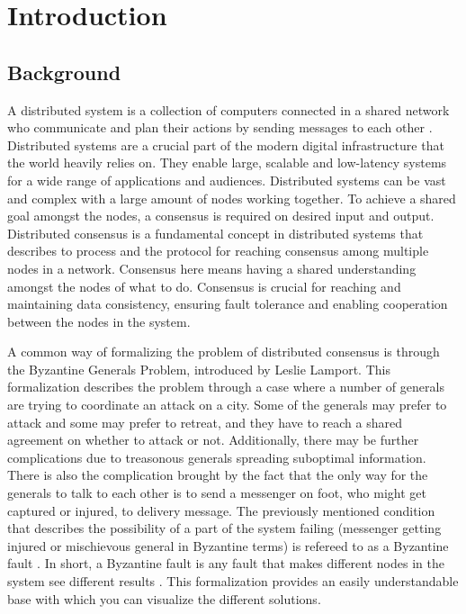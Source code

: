 \section{Introduction}
\thispagestyle{empty}

\subsection{Background}

A distributed system is a collection of computers connected in a shared network who communicate and plan their actions by sending messages to each other \cite{Coulouris_systems_2005}. Distributed systems are a crucial part of the modern digital infrastructure that the world heavily relies on. They enable large, scalable and low-latency systems for a wide range of applications and audiences. Distributed systems can be vast and complex with a large amount of nodes working together. To achieve a shared goal amongst the nodes, a consensus is required on desired input and output. Distributed consensus is a fundamental concept in distributed systems that describes to process and the protocol for reaching consensus among multiple nodes in a network. Consensus here means having a shared understanding amongst the nodes of what to do. Consensus is crucial for reaching and maintaining data consistency, ensuring fault tolerance and enabling cooperation between the nodes in the system. 

A common way of formalizing the problem of distributed consensus is through the Byzantine Generals Problem, introduced by Leslie Lamport. This formalization describes the problem through a case where a number of generals are trying to coordinate an attack on a city. Some of the generals may prefer to attack and some may prefer to retreat, and they have to reach a shared agreement on whether to attack or not. Additionally, there may be further complications due to treasonous generals spreading suboptimal information. There is also the complication brought by the fact that the only way for the generals to talk to each other is to send a messenger on foot, who might get captured or injured, to delivery message. 
The previously mentioned condition that describes the possibility of a part of the system failing (messenger getting injured or mischievous general in Byzantine terms) is refereed to as a Byzantine fault \cite{lamportByzantineGeneralsProblem}. In short, a Byzantine fault is any fault that makes different nodes in the system see different results \cite{driscollRealByzantineGenerals2004}.
This formalization provides an easily understandable base with which you can visualize the different solutions.

